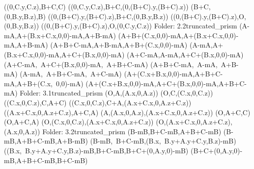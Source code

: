 \left(\left(0,C.y,C.z\right),B+C,C\right)
\left(\left(0,C.y,C.z\right),B+C,\left(0,\left(B+C\right).y,\left(B+C\right).z\right)\right)
\left(B+C,\left(0,B.y,B.z\right),B\right)
\left(\left(0,\left(B+C\right).y,\left(B+C\right).z\right),B+C,\left(0,B.y,B.z\right)\right)
\left(\left(0,\left(B+C\right).y,\left(B+C\right).z\right),O,\left(0,B.y,B.z\right)\right)
\left(\left(0,\left(B+C\right).y,\left(B+C\right).z\right),O,\left(0,C.y,C.z\right)\right)
Folder: 2.2truncated_prism
\left(A-mA,A+\left(B.x+C.x,0,0\right)-mA,A+B-mA\right)
\left(A+B+\left(C.x,0,0\right)-mA,A+\left(B.x+C.x,0,0\right)-mA,A+B-mA\right)
\left(A+B+C-mA,A+B-mA,A+B+\left(C.x,0,0\right)-mA\right)
\left(A-mA,A+\left(B.x+C.x,0,0\right)-mA,A+C+\left(B.x,0,0\right)-mA\right)
\left(A+C-mA,A-mA,A+C+\left(B.x,0,0\right)-mA\right)
\left(A+C-mA,\ A+C+\left(B.x,0,0\right)-mA,\ A+B+C-mA\right)
\left(A+B+C-mA,\ A-mA,\ A+B-mA\right)
\left(A-mA,\ A+B+C-mA,\ A+C-mA\right)
\left(A+\left(C.x+B.x,0,0\right)-mA,A+B+C-mA,A+B+\left(C.x,\ 0,0\right)-mA\right)
\left(A+\left(C.x+B.x,0,0\right)-mA,A+C+\left(B.x,0,0\right)-mA,A+B+C-mA\right)
Folder: 3.1truncated_prism
\left(O,A,\left(A.x,0,A.z\right)\right)
\left(O,C,\left(C.x,0,C.z\right)\right)
\left(\left(C.x,0,C.z\right),C,A+C\right)
\left(\left(C.x,0,C.z\right),C+A,\left(A.x+C.x,0,A.z+C.z\right)\right)
\left(\left(A.x+C.x,0,A.z+C.z\right),A+C,A\right)
\left(A,\left(A.x,0,A.z\right),\left(A.x+C.x,0,A.z+C.z\right)\right)
\left(O,A+C,C\right)
\left(O,A+C,A\right)
\left(O,\left(C.x,0,C.z\right),\left(A.x+C.x,0,A.z+C.z\right)\right)
\left(O,\left(A.x+C.x,0,A.z+C.z\right),\left(A.x,0,A.z\right)\right)
Folder: 3.2truncated_prism
\left(B-mB,B+C-mB,A+B+C-mB\right)
\left(B-mB,A+B+C-mB,A+B-mB\right)
\left(B-mB,\ B+C-mB,\left(B.x,\ B.y+A.y+C.y,B.z\right)-mB\right)
\left(\left(B.x,\ B.y+A.y+C.y,B.z\right)-mB,B+C-mB,B+C+\left(0,A.y,0\right)-mB\right)
\left(B+C+\left(0,A.y,0\right)-mB,A+B+C-mB,B+C-mB\right)
